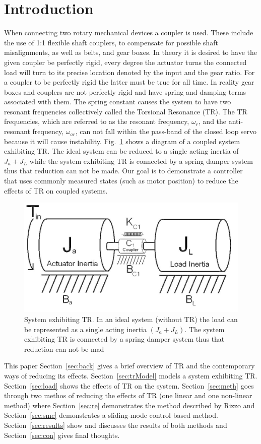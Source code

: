 \section{Introduction}

When connecting two rotary mechanical devices a coupler is used. These include the use of 1:1 flexible shaft couplers, to compensate for possible shaft misalignments, as well as belts, and gear boxes. In theory it is desired to have the given coupler be perfectly rigid, every degree the actuator turns the connected load will turn to its precise location denoted by the input and the gear ratio. For a coupler to be perfectly rigid the latter must be true for all time. In reality gear boxes and couplers are not perfectly rigid and have spring and damping terms associated with them. The spring constant causes the system to have two resonant frequencies collectively called the Torsional Resonance (TR). The TR frequencies, which are referred to as the resonant frequency, $\omega_r$, and the anti-resonant frequency, $\omega_{ar}$, can not fall within the pass-band of the closed loop servo because it will cause instability.  Fig.~\ref{fig:couple} shows a diagram of a coupled system exhibiting TR. The ideal system can be reduced to a single acting inertia of $J_a+J_L$ while the system exhibiting TR is connected by a spring damper system thus that reduction can not be made.  Our goal is to demonstrate a controller that uses commonly measured states (such as motor position) to reduce the effects of TR on coupled systems.

\begin{figure}[t]
  \centering
\includegraphics[width=1.0\columnwidth]{./pix/couple.png}
  \caption{System exhibiting TR. In an ideal
system (without TR) the load can be represented as a single acting inertia $(J_a+J_L)$.  The system exhibiting TR is connected by a
spring damper system thus that reduction can not be mad}
  \label{fig:couple}
\end{figure}

This paper 
Section~\ref{sec:back} gives a brief overview of TR and the contemporary ways of reducing its effects.
Section~\ref{sec:trModel} models a system exhibiting TR. 
Section~\ref{sec:load} shows the effects of TR on the system.
Section~\ref{sec:meth} goes through two methos of reducing the effects of TR (one linear and one non-linear method) where
Section~\ref{sec:re} demonstrates the method described by Rizzo and
Section~\ref{sec:smc} demonstrates a sliding-mode control based method.
Section~\ref{sec:results} show and discusses the results of both methods and 
Section~\ref{sec:con} gives final thoughts.


